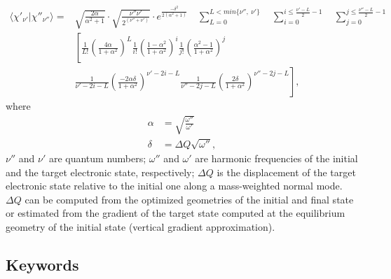 \documentclass[11pt]{article}
\begin{document}
\begin{align}
\langle\chi'_{\nu'} |\chi''_{\nu''}\rangle = &
\sqrt{\frac{2\alpha}{\alpha^2+1}}
\cdot
\sqrt{\frac{\nu''\nu'}{2^{(\nu''+\nu')}}}
\cdot
e^{\frac{-\delta^2}{2(\alpha^2+1)}} 
\quad
\sum_{L=0}^{L<min\{\nu'',\:\nu'\}} 
\quad
\sum_{i=0}^{i\le\frac{\nu'-L}{2}-1} 
\quad
\sum_{j=0}^{j\le\frac{\nu''-L}{2}-1}  \nonumber \\ 
&\left[\frac{1}{L!}\left(\frac{4\alpha}{1+\alpha^2}\right)^L
\frac{1}{i!}\left(\frac{1-\alpha^2}{1+\alpha^2}\right)^i
\frac{1}{j!}\left(\frac{\alpha^2-1}{1+\alpha^2}\right)^j \right. \nonumber\\
&\left.
\frac{1}{\nu'-2i-L}
\left(\frac{-2\alpha\delta}{1+\alpha^2}\right)^{\nu'-2i-L}
\frac{1}{\nu''-2j-L}
\left(\frac{2\delta}{1+\alpha^2}\right)^{\nu''-2j-L}\right],
\end{align}
where
\begin{align}
\alpha&=\sqrt{\frac{\omega''}{\omega'}}\nonumber\\
\delta&=\Delta Q\sqrt{\omega''},
\end{align}
$\nu''$ and $\nu'$ are quantum numbers; $\omega''$ and $\omega'$ are harmonic frequencies of the initial and the target 
electronic state, respectively; $\Delta Q$ is the displacement of the target electronic state relative to the initial one
along a mass-weighted normal mode. $\Delta Q$ can be computed from the optimized geometries of the initial and final state or estimated from the gradient of the target state computed at the equilibrium geometry
of the initial state (vertical gradient approximation).

\subsection{Keywords}
\label{sec:para:keywords}
\end{document}
